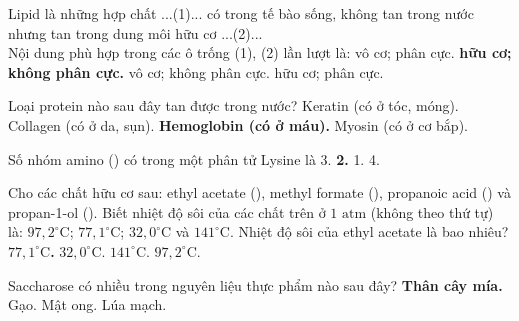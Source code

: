\documentclass[11pt,a4paper]{article}
\begin{document}
\begin{ex}
Lipid là những hợp chất ...(1)... có trong tế bào sống, không tan trong nước nhưng tan trong dung môi hữu cơ ...(2)...\\Nội dung phù hợp trong các ô trống (1), (2) lần lượt là:
\choice
{vô cơ; phân cực.}
{\textbf{\color{hfRed}hữu cơ; không phân cực.}}
{vô cơ; không phân cực.}
{hữu cơ; phân cực.}
\end{ex}
\begin{ex}
Loại protein nào sau đây tan được trong nước?
\choice
{Keratin (có ở tóc, móng).}
{Collagen (có ở da, sụn).}
{\textbf{\color{hfRed}Hemoglobin (có ở máu).}}
{Myosin (có ở cơ bắp).}
\end{ex}
\begin{ex}
Số nhóm amino () có trong một phân tử Lysine là
\choice
{3.}
{\textbf{\color{hfRed}2.}}
{1.}
{4.}
\end{ex}
\begin{ex}
Cho các chất hữu cơ sau: ethyl acetate (), methyl formate (), propanoic acid () và propan-1-ol (). Biết nhiệt độ sôi của các chất trên ở $1\text{ atm}$ (không theo thứ tự) là: $97{,}2^\circ\text{C}$; $77{,}1^\circ\text{C}$; $32{,}0^\circ\text{C}$ và $141^\circ\text{C}$. Nhiệt độ sôi của ethyl acetate là bao nhiêu?
\choice
{\textbf{\color{hfRed}$77{,}1^\circ\text{C}$.}}
{$32{,}0^\circ\text{C}$.}
{$141^\circ\text{C}$.}
{$97{,}2^\circ\text{C}$.}
\end{ex}
\begin{ex}
Saccharose có nhiều trong nguyên liệu thực phẩm nào sau đây?
\choice
{\textbf{\color{hfRed}Thân cây mía.}}
{Gạo.}
{Mật ong.}
{Lúa mạch.}
\end{ex}
\end{document}

